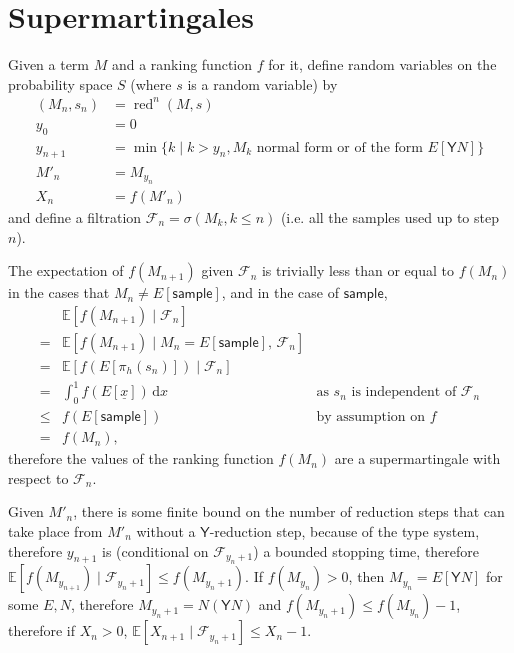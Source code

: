 \documentclass{article}
\newcommand{\Y}{\textsf{Y}}
\newcommand{\sample}{\textsf{sample}}
\DeclareMathOperator{\red}{red}
\begin{document}
\section{Supermartingales}
Given a term $M$ and a ranking function $f$ for it, define random variables on the probability space $S$ (where $s$ is a random variable) by
\begin{align*}
(M_n,s_n) & = \red^n(M,s) \\
y_0 & = 0 \\
y_{n+1} & = \min \{ k \mid k>y_n, M_k \text{ normal form or of the form } E[\Y N] \}\\
M'_n & = M_{y_n} \\
X_n & = f(M'_n)
\end{align*}
and define a filtration $\mathcal{F}_n = \sigma(M_k, k \leq n)$ (i.e. all the samples used up to step $n$).



The expectation of $f(M_{n+1})$ given $\mathcal{F}_n$ is trivially less than or equal to $f(M_n)$ in the cases that $M_n \neq E[\sample]$, and in the case of $\sample$,
\begin{align*}
& \mathbb{E}[f(M_{n+1}) \mid \mathcal{F}_n] \\
= & \mathbb{E}[f(M_{n+1}) \mid M_n = E[\sample],\, \mathcal{F}_n] \\
= & \mathbb{E}[f(E[\pi_h(s_n)]) \mid \mathcal{F}_n] \\
= & \int_0^1 f(E[\underline x]) \, \mathrm{d} x \qquad & \text{as }s_n\text{ is independent of } \mathcal{F}_n \\
\leq & f(E[\sample]) \qquad & \text{by assumption on } f \\
= & f(M_n),
\end{align*}
therefore the values of the ranking function $f(M_n)$ are a supermartingale with respect to $\mathcal{F}_n$.

Given $M'_n$, there is some finite bound on the number of reduction steps that can take place from $M'_n$ without a $\Y$-reduction step, because of the type system, therefore $y_{n+1}$ is (conditional on $\mathcal{F}_{y_n+1}$) a bounded stopping time, therefore $\mathbb{E}[f(M_{y_{n+1}}) \mid \mathcal{F}_{y_n+1}] \leq f(M_{y_n+1})$. If $f(M_{y_n}) > 0$, then $M_{y_n} = E[\Y N]$ for some $E, N$, therefore $M_{y_n+1} = N (\Y N)$ and $f(M_{y_n+1}) \leq f(M_{y_n}) - 1$, therefore if $X_n > 0$, $\mathbb{E}[X_{n+1} \mid \mathcal{F}_{y_n+1}] \leq X_n - 1$.
\end{document}
